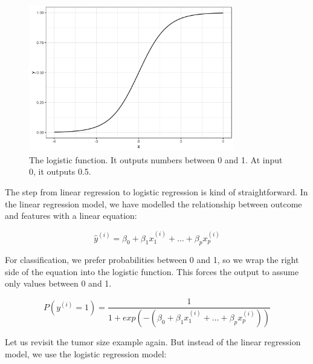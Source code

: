 \documentclass[
  10pt,
]{scrbook}
\begin{document}
\begin{figure}

{\centering \includegraphics[width=0.8\textwidth]{images/logistic-function-1} 

}

\caption{The logistic function. It outputs numbers between 0 and 1. At input 0, it outputs 0.5.}\label{fig:logistic-function}
\end{figure}

The step from linear regression to logistic regression is kind of straightforward.
In the linear regression model, we have modelled the relationship between outcome and features with a linear equation:

\[\hat{y}^{(i)}=\beta_{0}+\beta_{1}x^{(i)}_{1}+\ldots+\beta_{p}x^{(i)}_{p}\]

For classification, we prefer probabilities between 0 and 1, so we wrap the right side of the equation into the logistic function.
This forces the output to assume only values between 0 and 1.

\[P(y^{(i)}=1)=\frac{1}{1+exp(-(\beta_{0}+\beta_{1}x^{(i)}_{1}+\ldots+\beta_{p}x^{(i)}_{p}))}\]

Let us revisit the tumor size example again.
But instead of the linear regression model, we use the logistic regression model:
\end{document}
